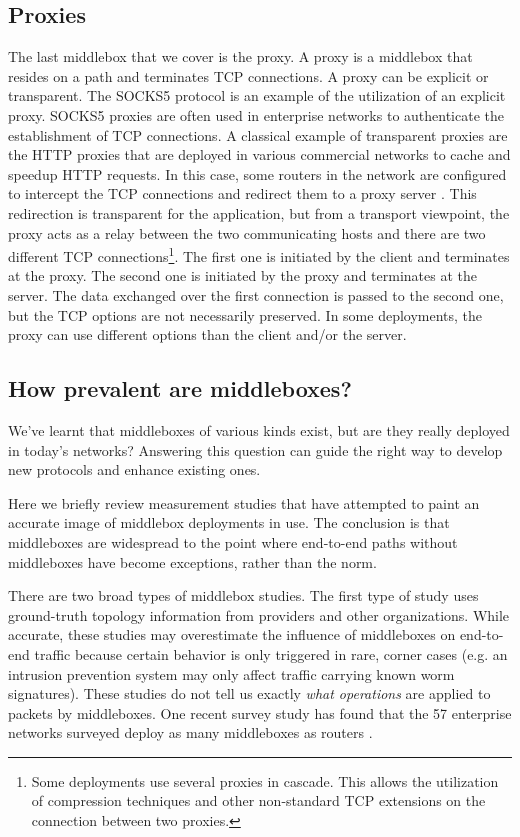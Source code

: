 \subsection{Proxies}

The last middlebox that we cover is the proxy. A proxy is a middlebox that resides on a path and terminates TCP connections. A proxy can be explicit or transparent. The SOCKS5 protocol \cite{rfc1928} is an example of the utilization of an explicit proxy. SOCKS5 proxies are often used in enterprise networks to authenticate the establishment of TCP connections. A classical example of transparent proxies are the HTTP proxies that are deployed in various commercial networks to cache and speedup HTTP requests. In this case, some routers in the network are configured to intercept the TCP connections and redirect them to a proxy server \cite{McLaggan_WCCP:2012}. This redirection is transparent for the application, but from a transport viewpoint, the proxy acts as a relay between the two communicating hosts and there are two different TCP connections\footnote{Some deployments use several proxies in cascade. This allows the utilization of compression techniques and other non-standard TCP extensions on the connection between two proxies.}. The first one is initiated by the client and terminates at the proxy. The second one is initiated by the proxy and terminates at the server. The data exchanged over the first connection is passed to the second one, but the TCP options are not necessarily preserved. In some deployments, the proxy can use different options than the client and/or the server.


\subsection{How prevalent are middleboxes?}

We've learnt that middleboxes of various kinds exist, but are they really deployed in today's networks? Answering
this question can guide the right way to develop new protocols and enhance existing ones. 

Here we briefly review measurement studies that have attempted to paint an accurate image of middlebox
deployments in use. The conclusion is that middleboxes are widespread to the point where 
end-to-end paths without middleboxes have become exceptions, rather than the norm.

There are two broad types of middlebox studies.
The first type of study uses ground-truth topology information from providers and other organizations.
While accurate, these studies may overestimate the influence of middleboxes on end-to-end traffic because
certain behavior is only triggered in rare, corner cases (e.g. an intrusion prevention system may only affect
traffic carrying known worm signatures). These studies do not tell us exactly \emph{what operations} are applied
to packets by middleboxes.
One recent survey study has found that the 57 enterprise networks surveyed deploy as many 
middleboxes as routers \cite{sherry2012making}. 

